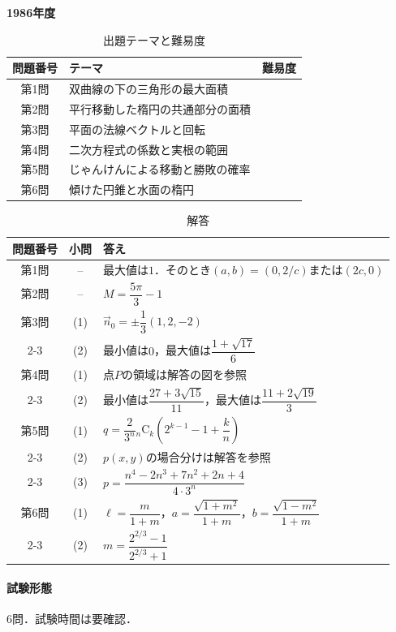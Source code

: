 \documentclass[../../main.tex]{subfiles}
\begin{document}
\begin{center}
  {\fontsize{48pt}{58pt}\selectfont \textbf{1986}\normalsize\textbf{年度}}
\end{center}

\begin{table}[htb]
  \centering
  \caption{出題テーマと難易度}
  \begin{tabular}{|c|p{9cm}|c|}
    \hline
    \textbf{問題番号} & \textbf{テーマ} & \textbf{難易度} \\
    \hline
    第1問 & 双曲線の下の三角形の最大面積 & \\
    \hline
    第2問 & 平行移動した楕円の共通部分の面積 & \\
    \hline
    第3問 & 平面の法線ベクトルと回転 & \\
    \hline
    第4問 & 二次方程式の係数と実根の範囲 & \\
    \hline
    第5問 & じゃんけんによる移動と勝敗の確率 & \\
    \hline
    第6問 & 傾けた円錐と水面の楕円 & \\
    \hline
  \end{tabular}
\end{table}

\begin{table}[htb]
  \centering
  \caption{解答}
  \renewcommand{\arraystretch}{1.4}
  \begin{tabular}{|c|c|p{9cm}|}
    \hline
    \textbf{問題番号} & \textbf{小問} & \textbf{答え} \\
    \hline
    第1問 & -- & 最大値は$1$．そのとき$(a,b)=(0,2/c)$または$(2c,0)$ \\
    \hline
    第2問 & -- & $M=\dfrac{5\pi}{3}-1$ \\
    \hline
    第3問 & (1) & $\vec{n}_0=\pm\dfrac{1}{3}(1,2,-2)$ \\
    \cline{2-3}
    & (2) & 最小値は$0$，最大値は$\dfrac{1+\sqrt{17}}{6}$ \\
    \hline
    第4問 & (1) & 点$P$の領域は解答の図を参照 \\
    \cline{2-3}
    & (2) & 最小値は$\dfrac{27+3\sqrt{15}}{11}$，最大値は$\dfrac{11+2\sqrt{19}}{3}$ \\
    \hline
    第5問 & (1) & $q=\dfrac{2}{3^n}{}_n\mathrm{C}_k\left(2^{k-1}-1+\dfrac{k}{n}\right)$ \\
    \cline{2-3}
    & (2) & $p(x,y)$の場合分けは解答を参照 \\
    \cline{2-3}
    & (3) & $p=\dfrac{n^4-2n^3+7n^2+2n+4}{4\cdot3^n}$ \\
    \hline
    第6問 & (1) & $\ell=\dfrac{m}{1+m}$，$a=\dfrac{\sqrt{1+m^2}}{1+m}$，$b=\dfrac{\sqrt{1-m^2}}{1+m}$ \\
    \cline{2-3}
    & (2) & $m=\dfrac{2^{2/3}-1}{2^{2/3}+1}$ \\
    \hline
  \end{tabular}
\end{table}

\paragraph{試験形態}
6問．試験時間は要確認．
\end{document}
